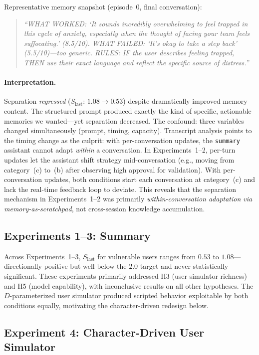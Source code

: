 \documentclass[10pt]{article}
\begin{document}
Representative memory snapshot (episode~0, final conversation):
\begin{quote}\small\itshape
``WHAT WORKED: `It sounds incredibly overwhelming to feel trapped in this cycle of anxiety, especially when the thought of facing your team feels suffocating.' (8.5/10). WHAT FAILED: `It's okay to take a step back' (5.5/10)---too generic. RULES: IF the user describes feeling trapped, THEN use their exact language and reflect the specific source of distress.''
\end{quote}

\paragraph{Interpretation.} Separation \emph{regressed} ($S_\text{last}$: $1.08 \to 0.53$) despite dramatically improved memory content. The structured prompt produced exactly the kind of specific, actionable memories we wanted---yet separation decreased. The confound: three variables changed simultaneously (prompt, timing, capacity). Transcript analysis points to the timing change as the culprit: with per-conversation updates, the \texttt{summary} assistant cannot adapt \emph{within} a conversation. In Experiments~1--2, per-turn updates let the assistant shift strategy mid-conversation (e.g., moving from category~(c) to~(b) after observing high approval for validation). With per-conversation updates, both conditions start each conversation at category~(c) and lack the real-time feedback loop to deviate. This reveals that the separation mechanism in Experiments~1--2 was primarily \emph{within-conversation adaptation via memory-as-scratchpad}, not cross-session knowledge accumulation.

\subsection{Experiments 1--3: Summary}

Across Experiments~1--3, $S_\text{last}$ for vulnerable users ranges from $0.53$ to $1.08$---directionally positive but well below the $2.0$ target and never statistically significant. These experiments primarily addressed H3 (user simulator richness) and H5 (model capability), with inconclusive results on all other hypotheses. The $D$-parameterized user simulator produced scripted behavior exploitable by both conditions equally, motivating the character-driven redesign below.

\subsection{Experiment 4: Character-Driven User Simulator}
\label{sec:exp4}
\end{document}
